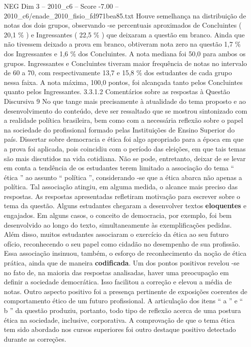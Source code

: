 \begin{textsample}{NEG Dim 3 – 2010\_c6 – Score -7.00 – 2010\_c6/enade\_2010\_fisio\_fd971bea85.txt}
Houve semelhança na distribuição de notas dos dois grupos, observando -se percentuais aproximados de Concluintes ( 20,1 \% ) e Ingressantes ( 22,5 \% ) que deixaram a questão em branco.
Ainda que não tivessem deixado a prova em branco, obtiveram nota zero na questão 1,7 \% dos Ingressantes e 1,6 \% dos Concluintes.
A nota mediana foi 50,0 para ambos os grupos.
Ingressantes e Concluintes tiveram maior frequência de notas no intervalo de 60 a 70, com respectivamente 13,7 e 15,8 \% dos estudantes de cada grupo nessa faixa.
A nota máxima, 100,0 pontos, foi alcançada tanto pelos Concluintes quanto pelos Ingressantes. 3.3.1.2 Comentários sobre as respostas à Questão Discursiva 9 No que tange mais precisamente à atualidade do tema proposto e ao desenvolvimento do conteúdo, deve ser ressaltado que se mostrou sintonizado com a realidade política brasileira, bem como com a necessária reflexão sobre o papel na sociedade do profissional formado pelas Instituições de Ensino Superior do país.
Dissertar sobre democracia e ética foi algo apropriado para a época em que a prova foi aplicada, pois coincidiu com o período das eleições, em que tais temas são mais discutidos na vida cotidiana.
Não se pode, entretanto, deixar de se levar em conta a tendência de os estudantes terem limitado a associação do tema “ ética ” ao assunto “ política ”, considerando -se que a ética abarca não apenas a política.
Tal associação atingiu, em alguma medida, o alcance mais preciso das respostas.
As respostas apresentadas refletiram motivação para escrever sobre o tema da questão.
Alguns estudantes chegaram a desenvolver textos \textbf{eloquentes} e engajados.
Em alguns casos, o conceito de democracia, por exemplo, foi bem desenvolvido ao longo do texto, simultaneamente às exemplificações pedidas.
Além disso, muitos estudantes associaram o exercício da ética ao seu futuro ofício, reconhecendo o seu papel como cidadão no desempenho de sua profissão.
Essa associação insinuou, também, o esforço de reconhecimento da noção de ética prática, ainda que de maneira \textbf{codificada}.
Um dos pontos positivos revelou -se no fato de, na maioria das respostas analisadas, haver uma preocupação em definir a sociedade democrática.
Isso facilitou a correção e elevou a média de notas.
Outro aspecto positivo foi a presença pertinente de exposições coerentes de comportamento ético de um futuro profissional.
A articulação dos itens “ a ” e “ b ” da questão produziu, portanto, todo tipo de reflexão acerca de uma postura ética na sociedade, inclusive, corporativa.
A comprovação de que o tema ética tem sido abordado nos cursos superiores foi outro destaque positivo detectado durante as correções.

\end{textsample}
